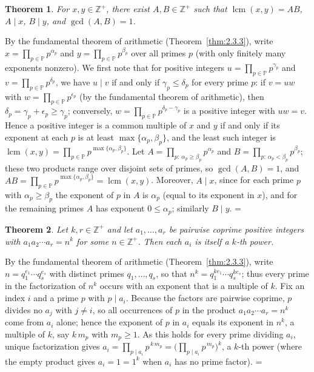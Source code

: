 \documentclass[11pt]{article}
\makeatletter
\let\nt@closedisplay\]
\def\nt@guardedclose{\@ifnextchar\par{\nt@closeafterpar}{\@ifnextchar\end{\postdisplaypenalty\@M\nt@closedisplay}{\nt@closedisplay}}}
\def\nt@closeafterpar\par{\@ifnextchar\par{\nt@closeafterpar}{\@ifnextchar\end{\postdisplaypenalty\@M\nt@closedisplay\par}{\nt@closedisplay\par}}}
\renewenvironment{proof}[1][\proofname]{\par
  \pushQED{\qed}\normalfont\topsep\medskipamount\edef\nt@afterproof{\@endparpenalty=\the\@endparpenalty\relax}\@beginparpenalty\@M\@endparpenalty\@M\let\]\nt@guardedclose\trivlist\item[]\textit{#1\@addpunct{.}} \ignorespaces}{\ifvmode\addpenalty\@M\fi\popQED\nt@afterproof\endtrivlist\@endpefalse}
\theoremstyle{ntstyle}
\newtheorem{theorem}{Theorem}[subsection]
\newcommand{\Primes}{\mathbb{P}}
\DeclareMathOperator{\lcm}{lcm}
\makeatother
\begin{document}
\begin{theorem}\label{thm:2.3.5} For $x, y \in \mathbb{Z}^+$,
  there exist $A, B \in \mathbb{Z}^+$ such that
  $\lcm(x, y) = AB$, $A \mid x$, $B \mid y$, and $\gcd(A, B) = 1$.

\end{theorem}

\begin{proof} By the fundamental theorem of arithmetic (Theorem~\ref{thm:2.3.3}),
  write $x = \prod_{p\in\Primes} p^{\alpha_p}$ and $y = \prod_{p\in\Primes} p^{\beta_p}$ over all primes $p$ (with
  only finitely many exponents
  nonzero). We first note that for positive integers $u = \prod_{p\in\Primes} p^{\gamma_p}$ and
  $v = \prod_{p\in\Primes} p^{\delta_p}$, we have $u \mid v$ if and only if
  $\gamma_p \le \delta_p$ for every prime $p$: if $v = uw$ with $w = \prod_{p\in\Primes} p^{\epsilon_p}$ (by the
  fundamental theorem of arithmetic), then $\delta_p = \gamma_p + \epsilon_p \ge \gamma_p$; conversely,
  $w = \prod_{p\in\Primes} p^{\delta_p - \gamma_p}$ is a
  positive integer with $uw = v$. Hence a positive integer is a common
  multiple of $x$ and $y$ if and only if its exponent at each $p$ is at least
    $\max\{\alpha_p, \beta_p\}$, and the least such integer is
  $\lcm(x, y) = \prod_{p\in\Primes} p^{\max\{\alpha_p, \beta_p\}}$. Let
  $A = \prod_{p:\ \alpha_p \ge \beta_p} p^{\alpha_p}$ and $B = \prod_{p:\ \alpha_p < \beta_p} p^{\beta_p}$; these
  two products range
  over disjoint sets of primes, so $\gcd(A, B) = 1$, and
  $AB = \prod_{p\in\Primes} p^{\max\{\alpha_p, \beta_p\}} = \lcm(x, y)$. Moreover, $A \mid x$, since for each prime
  $p$ with $\alpha_p \ge \beta_p$ the
  exponent of $p$ in $A$ is $\alpha_p$ (equal to its exponent in $x$),
  and for the remaining primes $A$ has exponent $0 \le \alpha_p$;
  similarly $B \mid y$.
\end{proof}

\begin{theorem}\label{thm:2.3.6} Let $k,r\in\mathbb{Z}^+$ and let
  $a_1,\ldots,a_r$ be pairwise coprime
  positive integers with $a_1a_2\cdots a_r=n^{k}$ for some
  $n\in\mathbb{Z}^+$. Then each $a_i$ is itself a $k$-th power.

\end{theorem}

\begin{proof} By the fundamental theorem of arithmetic
  (Theorem~\ref{thm:2.3.3}), write $n=q_1^{e_1}\cdots q_s^{e_s}$ with distinct
  primes $q_1,\ldots,q_s$, so that $n^{k}=q_1^{ke_1}\cdots q_s^{ke_s}$;
  thus every prime in the factorization of $n^{k}$ occurs with an
  exponent that is a multiple of $k$. Fix an index $i$ and a prime $p$
  with $p\mid a_i$. Because the factors are pairwise coprime, $p$
  divides no $a_j$ with $j\neq i$, so all occurrences of $p$ in the
  product $a_1a_2\cdots a_r=n^{k}$ come from $a_i$ alone; hence the
  exponent of $p$ in $a_i$ equals its exponent in $n^{k}$, a multiple
  of $k$, say $k\,m_p$ with $m_p\ge1$. As this holds for every prime
  dividing $a_i$, unique factorization gives
  $a_i=\prod_{p\mid a_i}p^{\,k\,m_p}=\Big(\prod_{p\mid a_i}p^{\,m_p}\Big)^{k}$, a $k$-th
  power (where the empty product gives $a_i=1=1^{k}$ when $a_i$ has no prime
  factor).
\end{proof}
\end{document}

